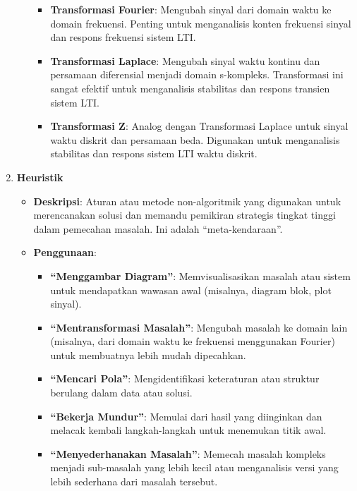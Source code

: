 \documentclass[
  letterpaper,
  DIV=11,
  numbers=noendperiod]{scrreprt}
\providecommand{\tightlist}{%
  \setlength{\itemsep}{0pt}\setlength{\parskip}{0pt}}
\begin{document}
\begin{enumerate}
\begin{itemize}
    \begin{itemize}
    \tightlist
    \item
      \textbf{Transformasi Fourier}: Mengubah sinyal dari domain waktu
      ke domain frekuensi. Penting untuk menganalisis konten frekuensi
      sinyal dan respons frekuensi sistem LTI.
    \item
      \textbf{Transformasi Laplace}: Mengubah sinyal waktu kontinu dan
      persamaan diferensial menjadi domain s-kompleks. Transformasi ini
      sangat efektif untuk menganalisis stabilitas dan respons transien
      sistem LTI.
    \item
      \textbf{Transformasi Z}: Analog dengan Transformasi Laplace untuk
      sinyal waktu diskrit dan persamaan beda. Digunakan untuk
      menganalisis stabilitas dan respons sistem LTI waktu diskrit.
    \end{itemize}
  \end{itemize}
\item
  \textbf{Heuristik}

  \begin{itemize}
  \tightlist
  \item
    \textbf{Deskripsi}: Aturan atau metode non-algoritmik yang digunakan
    untuk merencanakan solusi dan memandu pemikiran strategis tingkat
    tinggi dalam pemecahan masalah. Ini adalah ``meta-kendaraan''.
  \item
    \textbf{Penggunaan}:

    \begin{itemize}
    \tightlist
    \item
      \textbf{``Menggambar Diagram''}: Memvisualisasikan masalah atau
      sistem untuk mendapatkan wawasan awal (misalnya, diagram blok,
      plot sinyal).
    \item
      \textbf{``Mentransformasi Masalah''}: Mengubah masalah ke domain
      lain (misalnya, dari domain waktu ke frekuensi menggunakan
      Fourier) untuk membuatnya lebih mudah dipecahkan.
    \item
      \textbf{``Mencari Pola''}: Mengidentifikasi keteraturan atau
      struktur berulang dalam data atau solusi.
    \item
      \textbf{``Bekerja Mundur''}: Memulai dari hasil yang diinginkan
      dan melacak kembali langkah-langkah untuk menemukan titik awal.
    \item
      \textbf{``Menyederhanakan Masalah''}: Memecah masalah kompleks
      menjadi sub-masalah yang lebih kecil atau menganalisis versi yang
      lebih sederhana dari masalah tersebut.
    \end{itemize}
  \end{itemize}
\end{enumerate}
\end{document}
